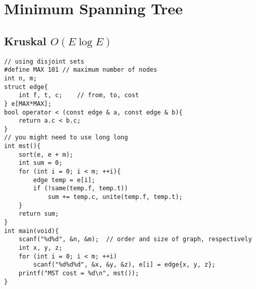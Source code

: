 \documentclass[12pt]{book}
\begin{document}
\chapter{Minimum Spanning Tree}
\section{Kruskal $O(E\log E)$}
\begin{verbatim}
// using disjoint sets
#define MAX 101	// maximum number of nodes
int n, m;
struct edge{
	int f, t, c;	// from, to, cost
} e[MAX*MAX];
bool operator < (const edge & a, const edge & b){
	return a.c < b.c;
}
// you might need to use long long
int mst(){
	sort(e, e + m);
	int sum = 0;
	for (int i = 0; i < m; ++i){
		edge temp = e[i];
		if (!same(temp.f, temp.t))
			sum += temp.c, unite(temp.f, temp.t);
	}
	return sum;
}
int main(void){
	scanf("%d%d", &n, &m);  // order and size of graph, respectively
	int x, y, z;
	for (int i = 0; i < m; ++i)
		scanf("%d%d%d", &x, &y, &z), e[i] = edge{x, y, z};
	printf("MST cost = %d\n", mst());
}
\end{verbatim}
\end{document}
